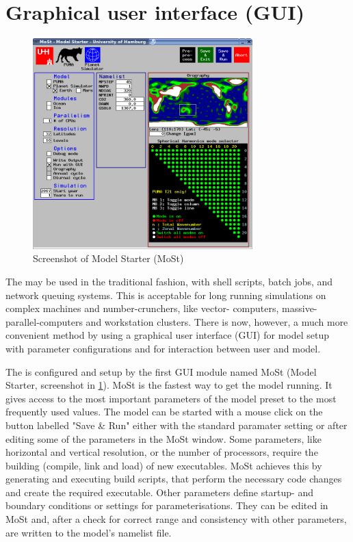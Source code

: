 \section{Graphical user interface (GUI)}
\label{sec_GUI}

\begin{figure}
   \centering
   \includegraphics[width=8.5cm]{Pics/mostsnap}
   \caption[]{Screenshot of Model Starter (MoSt)}
   \label{mostsnap}
\end{figure}

The {\model} may be used in the traditional fashion,
with shell scripts, batch jobs, and network queuing 
systems. This is acceptable for long running simulations
on complex machines and number-crunchers, like vector-
computers, massive-parallel-computers and workstation clusters.
There is now, however, a much more convenient method by using
a graphical user interface (GUI) for model setup with parameter configurations
and for interaction between user and model.


The {\model} is configured and setup by the first
GUI module named MoSt (Model Starter, screenshot in \ref{mostsnap}). 
MoSt is the fastest way to get the
model running. It gives access to the most important parameters of
the model preset to the most frequently used values.
The model can be started with a mouse click on the button
labelled "Save \& Run" either with the standard paramater setting
or after editing some of the parameters in the MoSt window.
Some parameters, like horizontal and vertical resolution,
or the number of processors, require the building
(compile, link and load) of new executables. MoSt achieves
this by generating and executing build scripts,
that perform the necessary code changes and
create the required executable.
Other parameters define startup- and
boundary conditions or settings for parameterisations.
They can be edited in MoSt and, after a check for
correct range and consistency with other parameters,
are written to the model's namelist file.

